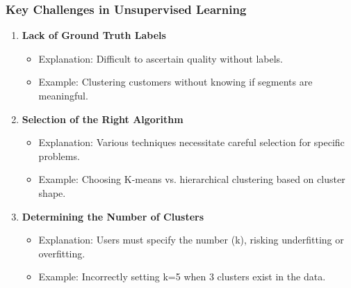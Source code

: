 \documentclass[aspectratio=169]{beamer}
\begin{document}
\begin{frame}[fragile]
    \frametitle{Key Challenges in Unsupervised Learning}

    \begin{enumerate}
        \item \textbf{Lack of Ground Truth Labels}
        \begin{itemize}
            \item Explanation: Difficult to ascertain quality without labels.
            \item Example: Clustering customers without knowing if segments are meaningful.
        \end{itemize}

        \item \textbf{Selection of the Right Algorithm}
        \begin{itemize}
            \item Explanation: Various techniques necessitate careful selection for specific problems.
            \item Example: Choosing K-means vs. hierarchical clustering based on cluster shape.
        \end{itemize}

        \item \textbf{Determining the Number of Clusters}
        \begin{itemize}
            \item Explanation: Users must specify the number (k), risking underfitting or overfitting.
            \item Example: Incorrectly setting k=5 when 3 clusters exist in the data.
        \end{itemize}
    \end{enumerate}
\end{frame}
\end{document}
